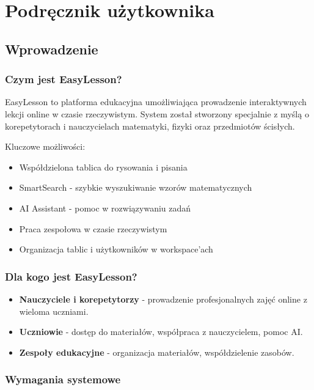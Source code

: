 \documentclass[12pt,a4paper]{article}
\begin{document}
\newpage

\section{Podręcznik użytkownika}

\subsection{Wprowadzenie}

\subsubsection{Czym jest EasyLesson?}

EasyLesson to platforma edukacyjna umożliwiająca prowadzenie interaktywnych lekcji online w czasie rzeczywistym. System został stworzony specjalnie z myślą o korepetytorach i nauczycielach matematyki, fizyki oraz przedmiotów ścisłych.


Kluczowe możliwości:
\begin{itemize}
    \item Współdzielona tablica do rysowania i pisania
    \item SmartSearch - szybkie wyszukiwanie wzorów matematycznych
    \item AI Assistant - pomoc w rozwiązywaniu zadań
    \item Praca zespołowa w czasie rzeczywistym
    \item Organizacja tablic i użytkowników w workspace'ach
\end{itemize}

\subsubsection{Dla kogo jest EasyLesson?}

\begin{itemize}
    \item \textbf{Nauczyciele i korepetytorzy} - prowadzenie profesjonalnych zajęć online z wieloma uczniami.
    \item \textbf{Uczniowie} - dostęp do materiałów, współpraca z nauczycielem, pomoc AI.
    \item \textbf{Zespoły edukacyjne} - organizacja materiałów, współdzielenie zasobów.
\end{itemize}

\subsubsection{Wymagania systemowe}
\end{document}
